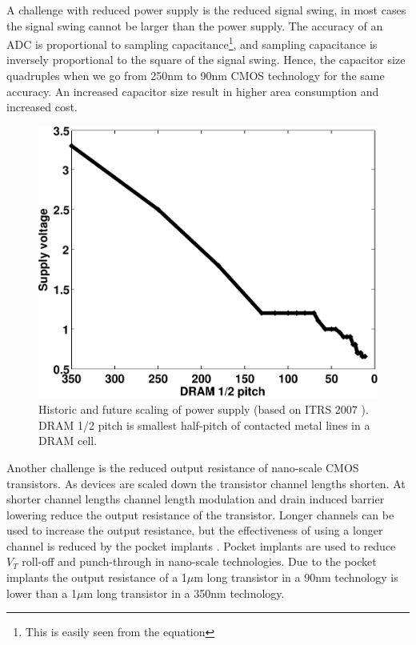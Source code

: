 A challenge with reduced power supply is the reduced signal swing, 
in most cases the signal swing cannot be larger than the power supply.
The accuracy of an ADC is proportional to sampling
capacitance\footnote{This is easily seen from the equation
}, and
sampling capacitance is inversely proportional to the square of the
signal swing.
 Hence, the capacitor
  size quadruples when we go from 250nm to 90nm CMOS
  technology for the same accuracy. An increased
  capacitor size result in higher area consumption and increased cost.
\begin{figure}[htbp]
\centerline{ \includegraphics[width=\myfigwidthb]{graphics/supplyscaling}}
  \caption{Historic and future 
    scaling of power supply (based on ITRS 2007
    \cite{itrs07}). DRAM 1/2 pitch is smallest half-pitch of
  contacted metal lines in a DRAM cell.} 
  \label{fig:supplyscaling}
\end{figure}


Another challenge is the reduced output resistance of nano-scale CMOS transistors.
  As devices are scaled down the
  transistor channel lengths  shorten. At shorter channel lengths channel
  length modulation and drain induced barrier lowering \cite{troutman79} reduce the output resistance of the
  transistor. Longer channels can be used to increase
  the output resistance, but the effectiveness of using a longer channel is reduced by the pocket
  implants \cite{cao99}. Pocket implants are used to reduce $V_T$ roll-off and
  punch-through in nano-scale technologies. 
Due to the pocket implants the output resistance of a 1$\mu$m long
  transistor in a 90nm technology is lower than a 1$\mu$m long transistor in
  a 350nm technology.

